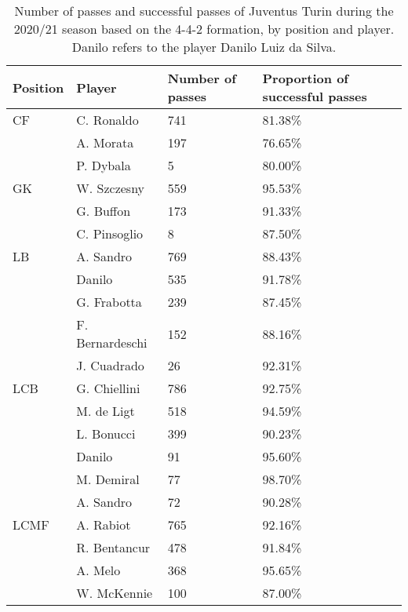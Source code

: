 \begin{table}[!htbp]
\centering
\caption{Number of passes and successful passes of Juventus Turin during the 2020/21 season based on the 4-4-2 formation,
by position and player.
Danilo refers to the player Danilo Luiz da Silva.}\s
\scriptsize
\begin{tabular}{@{}llll@{}}
\hline
Position & Player      & Number of passes & Proportion of successful passes  \\ \midrule
CF               & C. Ronaldo & 741         & 81.38\%  \\
               & A. Morata     & 197         & 76.65\%  \\
               & P. Dybala         & 5           & 80.00\%  \\
GK               & W. Szczesny       & 559         & 95.53\%  \\
              & G. Buffon         & 173         & 91.33\%  \\
               & C. Pinsoglio      & 8           & 87.50\%  \\
LB               & A. Sandro       & 769         & 88.43\%  \\
              & Danilo           & 535         & 91.78\%  \\
              & G. Frabotta       & 239         & 87.45\%  \\
               & F. Bernardeschi   & 152         & 88.16\%  \\
               & J. Cuadrado       & 26          & 92.31\%  \\
LCB              & G. Chiellini      & 786         & 92.75\%  \\
            & M. de Ligt        & 518         & 94.59\%  \\
             & L. Bonucci        & 399         & 90.23\%  \\
             & Danilo            & 91          & 95.60\%  \\
             & M. Demiral        & 77          & 98.70\%  \\
              & A. Sandro       & 72          & 90.28\%  \\
LCMF             & A. Rabiot         & 765         & 92.16\%  \\
            & R. Bentancur      & 478         & 91.84\%  \\
             & A. Melo            & 368         & 95.65\%  \\
            & W. McKennie       & 100         & 87.00\%  \\

\end{tabular}
\end{table}

